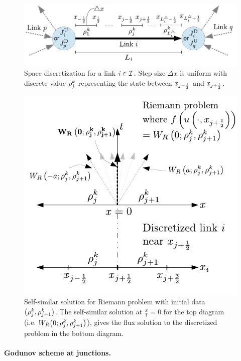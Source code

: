 		\begin{figure}
			\begin{centering}
				\includegraphics[width=0.6\columnwidth]{figs-gen/dx}
				\par\end{centering}
								
				\caption{Space discretization for a link $i\in\mathcal{I}$. Step size $\Delta x$ is uniform with discrete value $\rho_{j}^{k}$ representing
					the state between $x_{j-\frac{1}{2}}$ and $x_{j + \frac{1}{2}}$.\label{fig:Space-discretization-for}}
								
								
				\end{figure}

				\begin{figure}[t]
					\begin{centering}
						\includegraphics[width=0.5\columnwidth]{figs-gen/dx-to-riemann}
						\par\end{centering}
												
						\caption{Self-similar solution for Riemann problem with initial data $\left(\discrete{\xind}{\tind},\discrete{\xind+1}{\tind}\right)$.
							The self-similar solution at $\frac{x}{t}=0$ for the top diagram
							(i.e. $\ss 0{\discrete{\xind}{\tind}}{\discrete{\xind+1}{\tind}}$),
							gives the flux solution to the discretized problem in the bottom diagram.\label{fig:Self-similar-solution-for}}
						\end{figure}												
												
												
						\paragraph{Godunov scheme at junctions.\label{par:Godunov-scheme-at}}
												
